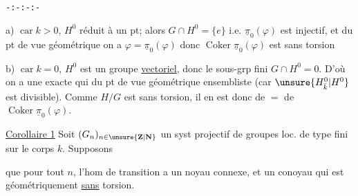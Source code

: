 \begin{center}\texttt{-:-:-:-}\end{center}



a) $\operatorname{car}k>0$,   $H^0$  réduit à un pt; alors $G\cap H^0=\{e\}$ i.e. $\underline{\pi}_0(\varphi)$ est injectif, et du pt de vue géométrique  on a $\varphi=\underline{\pi}_0(\varphi)$ donc $\operatorname{Coker}\underline{\pi}_0(\varphi)$ est sans torsion

b) $\operatorname{car}k=0$, $H^0$ est un groupe \uline{vectoriel},  donc le sous-grp fini $G\cap H^0=0$.
D'où  on a une  exacte
qui  du pt de vue géométrique ensembliste (car $\unsure{H^0_{\bar{k}}|H^0}$ est divisible). Comme $H/G$ est sans torsion, il en est donc de $=$ de $\operatorname{Coker}\underline{\pi}_0(\varphi)$.

\uline{Corollaire 1} Soit $(G_n)_{n\in\unsure{\mathbf{Z}|\mathbf{N}}}$ un syst projectif de groupes  loc. de type fini sur le corps $k$. Supposons


 que pour tout $n$, l'hom de transition
 a un noyau connexe, et un conoyau qui est géométriquement \uline{sans} torsion.



